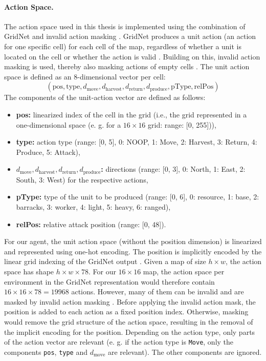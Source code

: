 \documentclass[10pt,twocolumn,letterpaper]{article}
\begin{document}
\paragraph{Action Space.}
The action space used in this thesis is implemented using the combination of GridNet and invalid action masking \cite{huang2021gym}.
GridNet produces a unit action (an action for one specific cell) for each cell of the map, regardless of whether a unit is located on the cell or whether the action is valid \cite{pmlr-v97-han19a}.
Building on this, invalid action masking is used, thereby also masking actions of empty cells \cite{huang2021gym}.
The unit action space is defined as an 8-dimensional vector per cell:
\[
(\text{pos}, \text{type}, d_{\text{move}}, d_{\text{harvest}}, d_{\text{return}}, d_{\text{produce}}, \text{pType}, \text{relPos})
\]
The components of the unit-action vector are defined as follows:
\begin{itemize}
\item \textbf{pos:} linearized index of the cell in the grid (i.e., the grid represented in a one-dimensional space (e. g. for a $16\times 16$ grid: range: [0, 255])),
\item \textbf{type:} action type (range: [0, 5], 0: NOOP, 1: Move, 2: Harvest, 3: Return, 4: Produce, 5: Attack),
\item \textbf{$d_{\text{move}}, d_{\text{harvest}}, d_{\text{return}}, d_{\text{produce}}$:} directions (range: [0, 3], 0: North, 1: East, 2: South, 3: West) for the respective actions,
\item \textbf{pType:} type of the unit to be produced (range: [0, 6], 0: resource, 1: base, 2: barracks, 3: worker, 4: light, 5: heavy, 6: ranged),
\item \textbf{relPos:} relative attack position (range: [0, 48]).
\end{itemize}
For our agent, the unit action space (without the position dimension) is linearized and represented using one-hot encoding.
The position is implicitly encoded by the linear grid indexing of the GridNet output \cite{huang2021gym}.
Given a map of size $h \times w$, the action space has shape $h \times w \times 78$.
For our $16 \times 16$ map, the action space per environment in the GridNet representation would therefore contain $16 \times 16 \times 78 = 19968$ actions.
However, many of them can be invalid and are masked by invalid action masking \cite{huang2021gym}.
Before applying the invalid action mask, the position is added to each action as a fixed position index.
Otherwise, masking would remove the grid structure of the action space, resulting in the removal of the implicit encoding for the position.
Depending on the action type, only parts of the action vector are relevant (e. g. if the action type is \texttt{Move}, only the components \texttt{pos}, \texttt{type} and \texttt{$d_{\text{move}}$} are relevant).
The other components are ignored.
\end{document}
